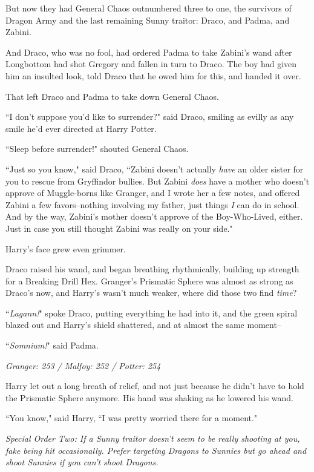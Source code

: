 But now they had General Chaos outnumbered three to one, the survivors of Dragon Army and the last remaining Sunny traitor: Draco, and Padma, and Zabini.

And Draco, who was no fool, had ordered Padma to take Zabini's wand after Longbottom had shot Gregory and fallen in turn to Draco. The boy had given him an insulted look, told Draco that he owed him for this, and handed it over.

That left Draco and Padma to take down General Chaos.

``I don't suppose you'd like to surrender?" said Draco, smiling as evilly as any smile he'd ever directed at Harry Potter.

``Sleep before surrender!" shouted General Chaos.

``Just so you know," said Draco, ``Zabini doesn't actually \emph{have} an older sister for you to rescue from Gryffindor bullies. But Zabini \emph{does} have a mother who doesn't approve of Muggle-borns like Granger, and I wrote her a few notes, and offered Zabini a few favors\---nothing involving my father, just things \emph{I} can do in school. And by the way, Zabini's mother doesn't approve of the Boy-Who-Lived, either. Just in case you still thought Zabini was really on your side."

Harry's face grew even grimmer.

Draco raised his wand, and began breathing rhythmically, building up strength for a Breaking Drill Hex. Granger's Prismatic Sphere was almost as strong as Draco's now, and Harry's wasn't much weaker, where did those two find \emph{time}?

``\emph{Lagann!}" spoke Draco, putting everything he had into it, and the green spiral blazed out and Harry's shield shattered, and at almost the same moment\---

``\emph{Somnium!}" said Padma.

\later

\emph{Granger: 253 / Malfoy: 252 / Potter: 254}

Harry let out a long breath of relief, and not just because he didn't have to hold the Prismatic Sphere anymore. His hand was shaking as he lowered his wand.

``You know," said Harry, ``I was pretty worried there for a moment."

\emph{Special Order Two: If a Sunny traitor doesn't seem to be really shooting at you, fake being hit occasionally. Prefer targeting Dragons to Sunnies but go ahead and shoot Sunnies if you can't shoot Dragons.}

